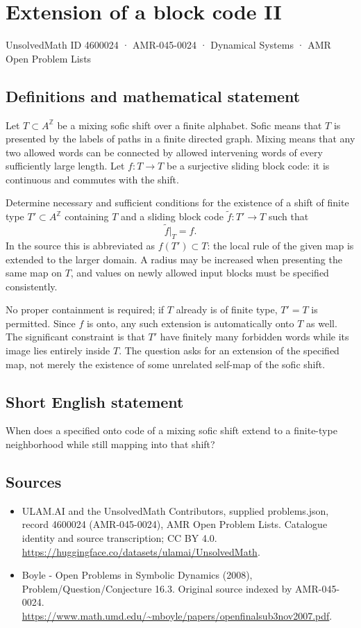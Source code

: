 \documentclass[11pt,a4paper]{article}
\begin{document}
\section*{Extension of a block code II}\label{4600024}
{\small UnsolvedMath ID 4600024 · AMR-045-0024 · Dynamical Systems · AMR Open Problem Lists}
\subsection{Definitions and mathematical statement}
Let $T\subset A^{\mathbb Z}$ be a mixing sofic shift over a finite
alphabet. Sofic means that $T$ is presented by the labels of paths in
a finite directed graph. Mixing means that any two allowed words can
be connected by allowed intervening words of every sufficiently large
length. Let $f:T\to T$ be a surjective sliding block code: it is
continuous and commutes with the shift.

Determine necessary and sufficient conditions for the existence of a
shift of finite type $T'\subset A^{\mathbb Z}$ containing $T$ and a
sliding block code $\widetilde f:T'\to T$ such that
\[
                    \widetilde f|_T=f.
\]
In the source this is abbreviated as $f(T')\subset T$: the local rule
of the given map is extended to the larger domain. A radius may be
increased when presenting the same map on $T$, and values on newly
allowed input blocks must be specified consistently.

No proper containment is required; if $T$ already is of finite type,
$T'=T$ is permitted. Since $f$ is onto, any such extension is
automatically onto $T$ as well. The significant constraint is that
$T'$ have finitely many forbidden words while its image lies entirely
inside $T$. The question asks for an extension of the specified map,
not merely the existence of some unrelated self-map of the sofic shift.
\subsection{Short English statement}
When does a specified onto code of a mixing sofic shift extend to a finite-type neighborhood while still mapping into that shift?
\subsection{Sources}
\begin{itemize}
\item[S1] ULAM.AI and the UnsolvedMath Contributors, supplied problems.json, record 4600024 (AMR-045-0024), AMR Open Problem Lists. Catalogue identity and source transcription; CC BY 4.0.
\url{https://huggingface.co/datasets/ulamai/UnsolvedMath}.
\item[S2] Boyle - Open Problems in Symbolic Dynamics (2008), Problem/Question/Conjecture 16.3. Original source indexed by AMR-045-0024.
\url{https://www.math.umd.edu/~mboyle/papers/openfinalsub3nov2007.pdf}.
\end{itemize}
\end{document}
